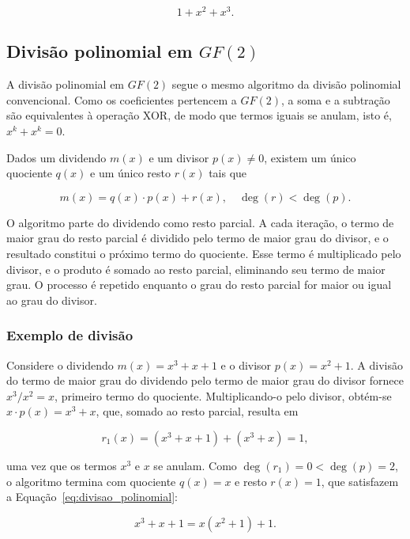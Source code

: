 \begin{equation}
	1 + x^2 + x^3.
\end{equation}

\subsection{Divisão polinomial em $GF(2)$}%
A divisão polinomial em $GF(2)$ segue o mesmo algoritmo da divisão polinomial convencional. Como os coeficientes pertencem a $GF(2)$, a soma e a subtração são equivalentes à operação XOR, de modo que termos iguais se anulam, isto é, $x^k + x^k = 0$.

Dados um dividendo $m(x)$ e um divisor $p(x) \neq 0$, existem um único quociente $q(x)$ e um único resto $r(x)$ tais que

\begin{equation}
	m(x) = q(x) \cdot p(x) + r(x), \quad \deg(r) < \deg(p).
	\label{eq:divisao_polinomial}
\end{equation}

O algoritmo parte do dividendo como resto parcial. A cada iteração, o termo de maior grau do resto parcial é dividido pelo termo de maior grau do divisor, e o resultado constitui o próximo termo do quociente. Esse termo é multiplicado pelo divisor, e o produto é somado ao resto parcial, eliminando seu termo de maior grau. O processo é repetido enquanto o grau do resto parcial for maior ou igual ao grau do divisor.

\subsubsection{Exemplo de divisão}%
Considere o dividendo $m(x) = x^3 + x + 1$ e o divisor $p(x) = x^2 + 1$. A divisão do termo de maior grau do dividendo pelo termo de maior grau do divisor fornece $x^3 / x^2 = x$, primeiro termo do quociente. Multiplicando-o pelo divisor, obtém-se $x \cdot p(x) = x^3 + x$, que, somado ao resto parcial, resulta em

\begin{equation}
	r_1(x) = (x^3 + x + 1) + (x^3 + x) = 1,
\end{equation}

\noindent uma vez que os termos $x^3$ e $x$ se anulam. Como $\deg(r_1) = 0 < \deg(p) = 2$, o algoritmo termina com quociente $q(x) = x$ e resto $r(x) = 1$, que satisfazem a Equação~\eqref{eq:divisao_polinomial}:

\begin{equation}
	x^3 + x + 1 = x(x^2 + 1) + 1.
\end{equation}

